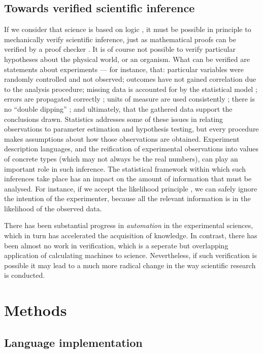 \subsection*{Towards verified scientific inference}

If we consider that science is based on logic \citep{Jaynes2003}, it
must be possible in principle to mechanically verify scientific
inference, just as mathematical proofs can be verified by a proof
checker \citep{Harrison2009}. It is of course not possible to verify particular
hypotheses about the physical world, or an organism. What can be
verified are statements about experiments --- for instance, that:
particular variables were randomly controlled and not observed;
outcomes have not gained correlation due to the analysis procedure;
missing data is accounted for by the statistical model
\citep{Gelman2003}; errors are propagated correctly
\citep{Taylor1997}; units of measure are used consistently
\citep{Kennedy1997}; there is no ``double dipping''
\citep{Kriegeskorte2009}; and ultimately, that the gathered data
support the conclusions drawn. Statistics addresses some of these
issues in relating observations to parameter estimation and hypothesis
testing, but every procedure makes assumptions about how those
observations are obtained. Experiment description languages, and the
reification of experimental observations into values of concrete types
(which may not always be the real numbers), can play an
important role in such inference. The statistical framework within
which such inferences take place has an impact on the amount of
information that must be analysed. For instance, if we accept the
likelihood principle \citep{Jaynes2003}, we can safely ignore the
intention of the experimenter, because all the relevant information is
in the likelihood of the observed data. 

There has been substantial progress in \emph{automation} in the
experimental sciences, which in turn has accelerated the acquisition
of knowledge. In contrast, there has been almost no work in
verification, which is a seperate but overlapping application of
calculating machines to science. Nevertheless, if such verification is
possible it may lead to a much more radical change in the way
scientific research is conducted.

\section*{Methods}

\subsection*{Language implementation} 

